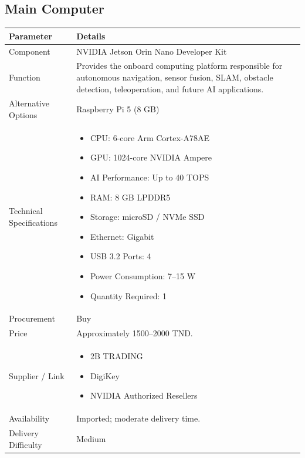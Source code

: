 \documentclass[12pt,a4paper]{article}
\begin{document}
\subsection{ Main Computer}
\begin{longtable}{|p{4cm}|p{10cm}|}
\hline
\textbf{Parameter} & \textbf{Details} \\
\hline

Component &
NVIDIA Jetson Orin Nano Developer Kit \\
\hline

Function &
Provides the onboard computing platform responsible for autonomous navigation, sensor fusion, SLAM, obstacle detection, teleoperation, and future AI applications. \\
\hline

Alternative Options &
Raspberry Pi 5 (8 GB)
\\
\hline

Technical Specifications &
\begin{itemize}
\item CPU: 6-core Arm Cortex-A78AE
\item GPU: 1024-core NVIDIA Ampere
\item AI Performance: Up to 40 TOPS
\item RAM: 8 GB LPDDR5
\item Storage: microSD / NVMe SSD
\item Ethernet: Gigabit
\item USB 3.2 Ports: 4
\item Power Consumption: 7--15 W
\item Quantity Required: 1
\end{itemize}
\\
\hline

Procurement &
Buy \\
\hline

Price &
Approximately 1500--2000 TND. \\
\hline

Supplier / Link &
\begin{itemize}
\item 2B TRADING
\item DigiKey
\item NVIDIA Authorized Resellers
\end{itemize}
\\
\hline

Availability &
Imported; moderate delivery time. \\
\hline

Delivery Difficulty &
Medium \\
\hline


\end{longtable}
\end{document}
